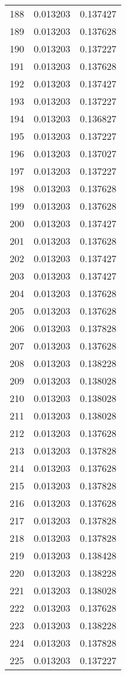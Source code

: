 \begin{longtable}{rrr}
188 & 0.013203 & 0.137427 \\
189 & 0.013203 & 0.137628 \\
190 & 0.013203 & 0.137227 \\
191 & 0.013203 & 0.137628 \\
192 & 0.013203 & 0.137427 \\
193 & 0.013203 & 0.137227 \\
194 & 0.013203 & 0.136827 \\
195 & 0.013203 & 0.137227 \\
196 & 0.013203 & 0.137027 \\
197 & 0.013203 & 0.137227 \\
198 & 0.013203 & 0.137628 \\
199 & 0.013203 & 0.137628 \\
200 & 0.013203 & 0.137427 \\
201 & 0.013203 & 0.137628 \\
202 & 0.013203 & 0.137427 \\
203 & 0.013203 & 0.137427 \\
204 & 0.013203 & 0.137628 \\
205 & 0.013203 & 0.137628 \\
206 & 0.013203 & 0.137828 \\
207 & 0.013203 & 0.137628 \\
208 & 0.013203 & 0.138228 \\
209 & 0.013203 & 0.138028 \\
210 & 0.013203 & 0.138028 \\
211 & 0.013203 & 0.138028 \\
212 & 0.013203 & 0.137628 \\
213 & 0.013203 & 0.137828 \\
214 & 0.013203 & 0.137628 \\
215 & 0.013203 & 0.137828 \\
216 & 0.013203 & 0.137628 \\
217 & 0.013203 & 0.137828 \\
218 & 0.013203 & 0.137828 \\
219 & 0.013203 & 0.138428 \\
220 & 0.013203 & 0.138228 \\
221 & 0.013203 & 0.138028 \\
222 & 0.013203 & 0.137628 \\
223 & 0.013203 & 0.138228 \\
224 & 0.013203 & 0.137828 \\
225 & 0.013203 & 0.137227 \\

\end{longtable}
